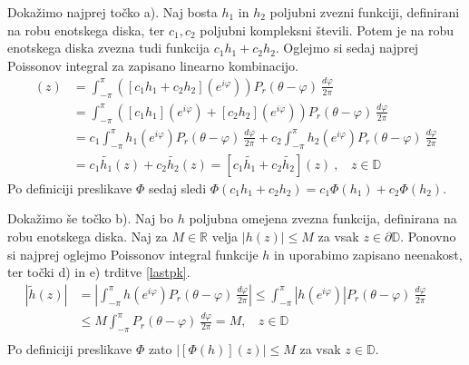 \documentclass[mat1]{fmfdelo}
\begin{document}
     \begin{dokaz}
            Dokažimo najprej točko a). Naj bosta $h_1$ in $h_2$ poljubni zvezni funkciji, definirani na robu enotskega diska, ter $c_1, c_2$ poljubni kompleksni števili. 
            Potem je na robu enotskega diska zvezna tudi funkcija $c_1 h_1 + c_2 h_2$. Oglejmo si sedaj najprej Poissonov integral za zapisano linearno kombinacijo.
            \begin{align*}
                [\widetilde{c_1 h_1 + c_2 h_2}](z) &= \int_{-\pi}^{\pi}{\left([c_1 h_1 + c_2 h_2](e^{i\varphi}) \right)P_r(\theta - \varphi)~\frac{d\varphi}{2 \pi}}\\ 
                & = \int_{-\pi}^{\pi}{\left([c_1 h_1](e^{i\varphi}) + [c_2 h_2](e^{i\varphi})\right)P_r(\theta - \varphi)~\frac{d\varphi}{2 \pi}}\\
                & = c_1\int_{-\pi}^{\pi}{h_1(e^{i\varphi})P_r(\theta - \varphi)~\frac{d\varphi}{2 \pi}} + c_2\int_{-\pi}^{\pi}{h_2(e^{i\varphi})P_r(\theta - \varphi)~\frac{d\varphi}{2 \pi}}\\
                & = c_1 \widetilde{h_1}(z) + c_2 \widetilde{h_2}(z) = [c_1 \widetilde{h_1} + c_2 \widetilde{h_2}](z)~,~~~~z \in \mathbb{D}
            \end{align*}
            Po definiciji preslikave $\Phi$ sedaj sledi $\Phi(c_1 h_1 + c_2 h_2) = c_1 \Phi(h_1) + c_2 \Phi(h_2)$.

            Dokažimo še točko b). Naj bo $h$ poljubna omejena zvezna funkcija, definirana na robu enotskega diska. Naj za $M \in \mathbb{R}$ velja $|h(z)| \leq M$ za vsak $z \in \partial \mathbb{D}$.
            Ponovno si najprej oglejmo Poissonov integral funkcije $h$ in uporabimo zapisano neenakost, ter točki d) in e) trditve \ref{lastpk}.
            \begin{align*}
                \left|\widetilde{h}(z)\right| &= \left| \int_{-\pi}^{\pi}{h(e^{i\varphi}) P_r(\theta - \varphi)~\frac{d\varphi}{2 \pi}} \right| \leq \int_{-\pi}^{\pi}{\left|h(e^{i\varphi}) \right|P_r(\theta - \varphi)~\frac{d\varphi}{2 \pi}} \\ 
                &\leq M \int_{-\pi}^{\pi}{P_r(\theta - \varphi)~\frac{d\varphi}{2 \pi}} = M,~~~~z \in \mathbb{D}& & \\
            \end{align*}
            Po definiciji preslikave $\Phi$ zato $|[\Phi(h)](z)| \leq M$ za vsak $z \in \mathbb{D}$.
     \end{dokaz}
\end{document}

